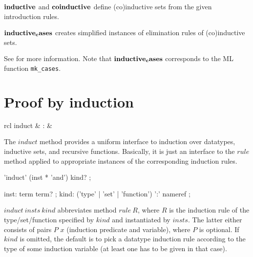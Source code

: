 \begin{descr}
\item [${\mathord{\mathbf{inductive}}}$ and ${\mathord{\mathbf{coinductive}}}$] define
  (co)inductive sets from the given introduction rules.
\item [${\mathord{\mathbf{inductive_cases}}}$] creates simplified instances of
  elimination rules of (co)inductive sets.
\end{descr}

See \cite{isabelle-HOL} for more information.  Note that
${\mathord{\mathbf{inductive_cases}}}$ corresponds to the ML function
\texttt{mk_cases}.


\section{Proof by induction}

\begin{matharray}{rcl}
  induct & : & \isarmeth \\
\end{matharray}

The $induct$ method provides a uniform interface to induction over datatypes,
inductive sets, and recursive functions.  Basically, it is just an interface
to the $rule$ method applied to appropriate instances of the corresponding
induction rules.

\begin{rail}
  'induct' (inst * 'and') kind?
  ;

  inst: term term?
  ;
  kind: ('type' | 'set' | 'function') ':' nameref
  ;
\end{rail}

\begin{descr}
\item [$induct~insts~kind$] abbreviates method $rule~R$, where $R$ is the
  induction rule of the type/set/function specified by $kind$ and instantiated
  by $insts$.  The latter either consists of pairs $P$ $x$ (induction
  predicate and variable), where $P$ is optional.  If $kind$ is omitted, the
  default is to pick a datatype induction rule according to the type of some
  induction variable (at least one has to be given in that case).
\end{descr}


